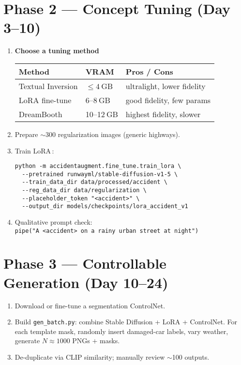 \documentclass[11pt]{article}
\begin{document}
\section*{Phase 2 — Concept Tuning (Day 3–10)}
\begin{enumerate}[leftmargin=*, label=\arabic*.]
  \item \textbf{Choose a tuning method}

    \begin{tabular}{@{}lll@{}}
    \textbf{Method} & \textbf{VRAM} & \textbf{Pros / Cons}\\\hline
    Textual Inversion & $\le4$ GB & ultralight, lower fidelity\\
    LoRA fine-tune & 6–8 GB & good fidelity, few params\\
    DreamBooth & 10–12 GB & highest fidelity, slower\\
    \end{tabular}

  \item Prepare $\sim$300 regularization images (generic highways).
  \item Train LoRA\,:\\[-4pt]
\begin{verbatim}
python -m accidentaugment.fine_tune.train_lora \
  --pretrained runwayml/stable-diffusion-v1-5 \
  --train_data_dir data/processed/accident \
  --reg_data_dir data/regularization \
  --placeholder_token "<accident>" \
  --output_dir models/checkpoints/lora_accident_v1
\end{verbatim}
  \item Qualitative prompt check:\\
    \verb|pipe("A <accident> on a rainy urban street at night")|
\end{enumerate}

\section*{Phase 3 — Controllable Generation (Day 10–24)}
\begin{enumerate}[leftmargin=*, label=\arabic*.]
  \item Download or fine-tune a segmentation ControlNet.
  \item Build \texttt{gen\_batch.py}: combine Stable Diffusion + LoRA + ControlNet.  
        For each template mask, randomly insert damaged-car labels, vary weather, generate $N\!\approx\!1000$ PNGs $+$ masks.
  \item De-duplicate via CLIP similarity; manually review $\sim$100 outputs.
\end{enumerate}
\end{document}
